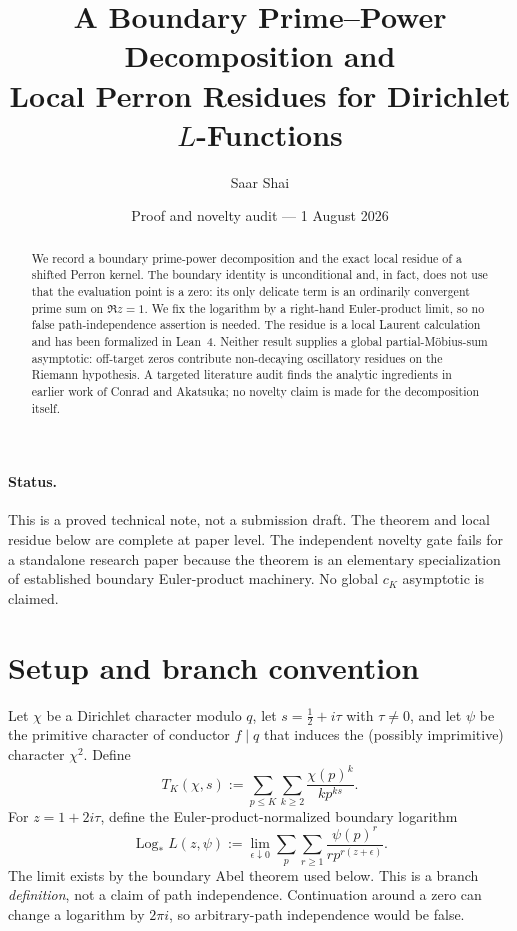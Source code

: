 \documentclass[11pt]{article}
\title{A Boundary Prime--Power Decomposition and\\
Local Perron Residues for Dirichlet $L$-Functions}
\author{Saar Shai}
\date{Proof and novelty audit --- 1 August 2026}
\DeclareMathOperator{\Log}{Log}
\begin{document}
\maketitle

\begin{abstract}
We record a boundary prime-power decomposition and the exact local residue of
a shifted Perron kernel.  The boundary identity is unconditional and, in fact,
does not use that the evaluation point is a zero: its only delicate term is an
ordinarily convergent prime sum on $\Re z=1$.  We fix the logarithm by a
right-hand Euler-product limit, so no false path-independence assertion is
needed.  The residue is a local Laurent calculation and has been formalized in
Lean~4.  Neither result supplies a global partial-M\"obius-sum asymptotic:
off-target zeros contribute non-decaying oscillatory residues on the Riemann
hypothesis.  A targeted literature audit finds the analytic ingredients in
earlier work of Conrad and Akatsuka; no novelty claim is made for the
decomposition itself.
\end{abstract}

\paragraph{Status.}
This is a proved technical note, not a submission draft.  The theorem and local
residue below are complete at paper level.  The independent novelty gate fails
for a standalone research paper because the theorem is an elementary
specialization of established boundary Euler-product machinery.  No global
$c_K$ asymptotic is claimed.

\section{Setup and branch convention}

Let $\chi$ be a Dirichlet character modulo $q$, let
$s=\tfrac12+i\tau$ with $\tau\ne0$, and let $\psi$ be the primitive
character of conductor $f\mid q$ that induces the (possibly imprimitive)
character $\chi^2$.  Define
\begin{equation}
 T_K(\chi,s)
 :=\sum_{p\le K}\sum_{k\ge2}
       \frac{\chi(p)^k}{k p^{ks}}.
\end{equation}
For $z=1+2i\tau$, define the Euler-product-normalized boundary logarithm
\begin{equation}\label{eq:boundary-log}
 \Log_*L(z,\psi)
 :=\lim_{\epsilon\downarrow0}
   \sum_p\sum_{r\ge1}\frac{\psi(p)^r}{r p^{r(z+\epsilon)}}.
\end{equation}
The limit exists by the boundary Abel theorem used below.  This is a branch
\emph{definition}, not a claim of path independence.  Continuation around a
zero can change a logarithm by $2\pi i$, so arbitrary-path independence would
be false.
\end{document}
